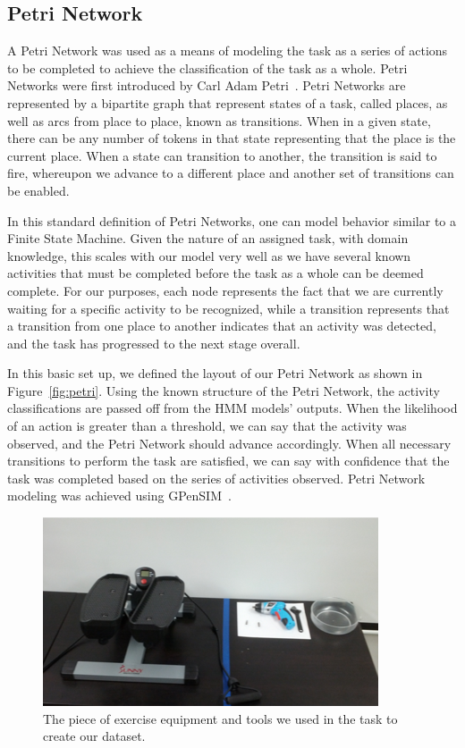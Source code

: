 \documentclass[10pt,twocolumn,letterpaper]{article}
\begin{document}
\subsection{Petri Network}
A Petri Network was used as a means of modeling the task as a series of actions to be completed to achieve the classification of the task as a whole. Petri Networks were first introduced by Carl Adam Petri~\cite{petri1962kommunikation}. Petri Networks are represented by a bipartite graph that represent states of a task, called places, as well as arcs from place to place, known as transitions. When in a given state, there can be any number of tokens in that state representing that the place is the current place. When a state can transition to another, the transition is said to fire, whereupon we advance to a different place and another set of transitions can be enabled.

In this standard definition of Petri Networks, one can model behavior similar to a Finite State Machine. Given the nature of an assigned task, with domain knowledge, this scales with our model very well as we have several known activities that must be completed before the task as a whole can be deemed complete. For our purposes, each node represents the fact that we are currently waiting for a specific activity to be recognized, while a transition represents that a transition from one place to another indicates that an activity was detected, and the task has progressed to the next stage overall.

In this basic set up, we defined the layout of our Petri Network as shown in Figure~\ref{fig:petri}. Using the known structure of the Petri Network, the activity classifications are passed off from the HMM models' outputs. When the likelihood of an action is greater than a threshold, we can say that the activity was observed, and the Petri Network should advance accordingly. When all necessary transitions to perform the task are satisfied, we can say with confidence that the task was completed based on the series of activities observed. Petri Network modeling was achieved using GPenSIM~\cite{davidrajuh2010gpensim}.

\begin{figure}[!t]
    \centering
    \includegraphics[width=\columnwidth]{fig/equipment.png}
    \caption{The piece of exercise equipment and tools we used in the task to create our dataset.}
    \label{fig:equipment}
\end{figure}
\end{document}
